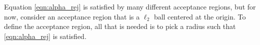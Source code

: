 Equation \eqref{eqn:alpha_rej} is satisfied by many different acceptance regions, but for now, consider an acceptance region that is a $\ell_2$ ball centered at the origin. To define the acceptance region, all that is needed is to pick a radius such that \eqref{eqn:alpha_rej} is satisfied. 